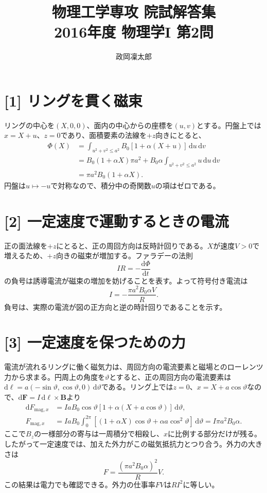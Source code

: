 \documentclass[11pt,a4paper]{article}
\title{物理工学専攻 院試解答集\\2016年度 物理学I 第2問}
\author{政岡凜太郎}
\date{}
\begin{document}
\maketitle

\section*{[1] リングを貫く磁束}
リングの中心を$(X,0,0)$、面内の中心からの座標を$(u,v)$とする。円盤上では$x=X+u$、$z=0$であり、面積要素の法線を$+z$向きにとると、
\begin{align}
  \Phi(X)&=\int_{u^2+v^2\le a^2} B_0[1+\alpha(X+u)]\,\mathrm d u\,\mathrm d v\\
  &=B_0(1+\alpha X)\pi a^2
    +B_0\alpha\int_{u^2+v^2\le a^2}u\,\mathrm d u\,\mathrm d v\\
  &=\boxed{\pi a^2B_0(1+\alpha X)}.
\end{align}
円盤は$u\mapsto-u$で対称なので、積分中の奇関数$u$の項はゼロである。

\section*{[2] 一定速度で運動するときの電流}
正の面法線を$+z$にとると、正の周回方向は反時計回りである。$X$が速度$V>0$で増えるため、$+z$向きの磁束が増加する。ファラデーの法則
\begin{equation}
  IR=-\frac{\mathrm d\Phi}{\mathrm dt}
\end{equation}
の負号は誘導電流が磁束の増加を妨げることを表す。よって符号付き電流は
\begin{equation}
  \boxed{I=-\frac{\pi a^2B_0\alpha V}{R}}.
\end{equation}
負号は、実際の電流が図の正方向と逆の時計回りであることを示す。

\section*{[3] 一定速度を保つための力}
電流が流れるリングに働く磁気力は、周回方向の電流要素と磁場とのローレンツ力から求まる。円周上の角度を$\vartheta$とすると、正の周回方向の電流要素は$\mathrm d\boldsymbol\ell=a(-\sin\vartheta,\cos\vartheta,0)\,\mathrm d\vartheta$である。リング上では$z=0$、$x=X+a\cos\vartheta$なので、$\mathrm d\boldsymbol F=I\,\mathrm d\boldsymbol\ell\times\boldsymbol B$より
\begin{align}
  \mathrm dF_{\mathrm{mag},x}
  &=IaB_0\cos\vartheta[1+\alpha(X+a\cos\vartheta)]\,\mathrm d\vartheta,\\
  F_{\mathrm{mag},x}
  &=IaB_0\int_0^{2\pi}
    [(1+\alpha X)\cos\vartheta+\alpha a\cos^2\vartheta]\,\mathrm d\vartheta
    =I\pi a^2B_0\alpha.
\end{align}
ここで$B_z$の一様部分の寄与は一周積分で相殺し、$x$に比例する部分だけが残る。したがって一定速度では、加えた外力がこの磁気抵抗力とつり合う。外力の大きさは
\begin{equation}
  \boxed{F=\frac{(\pi a^2B_0\alpha)^2}{R}V}.
\end{equation}
この結果は電力でも確認できる。外力の仕事率$FV$は$RI^2$に等しい。
\end{document}
